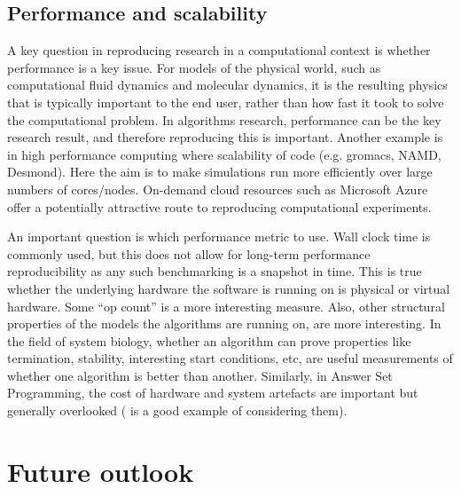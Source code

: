 \documentclass[conference]{IEEEtran}
\begin{document}
\subsection{Performance and scalability}

A key question in reproducing research in a computational context is
whether performance is a key issue. For models of the physical world,
such as computational fluid dynamics and molecular dynamics, it is the
resulting physics that is typically important to the end user, rather than how fast it
took to solve the computational problem. In algorithms research,
performance can be the key research result, and therefore reproducing
this is important. Another example is in high performance computing
where scalability of code (e.g. gromacs, NAMD, Desmond). Here the aim
is to make simulations run more efficiently over large numbers of
cores/nodes. On-demand cloud resources such as Microsoft Azure 
offer a potentially attractive route to reproducing computational experiments.

An important question is which performance metric to use. Wall clock time is
commonly used, but this does not allow for long-term performance
reproducibility as any such benchmarking is a snapshot in time. This
is true whether the underlying hardware the software is running on is
physical or virtual hardware. Some ``op count'' is a more interesting
measure. Also, other structural properties of the models the
algorithms are running on, are more interesting. In the field of
system biology, whether an algorithm can prove properties like
termination, stability, interesting start conditions, etc, are useful
measurements of whether one algorithm is better than
another. Similarly, in Answer Set Programming, the cost of hardware
and system artefacts are important but generally overlooked
(\cite{brain+devos:2009} is a good example of considering them).



\section{Future outlook}



\end{document}

